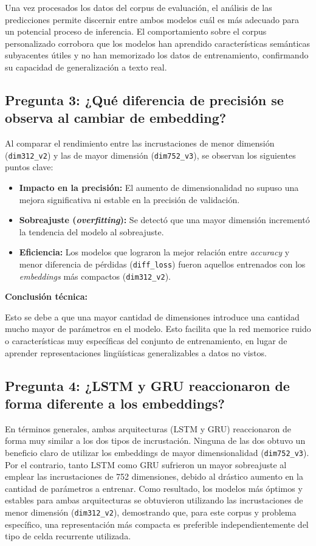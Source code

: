 \documentclass{article}
\begin{document}
Una vez procesados los datos del corpus de evaluación, el análisis de las predicciones
permite discernir entre ambos modelos cuál es más adecuado para un potencial proceso de
inferencia. El comportamiento sobre el corpus personalizado corrobora que los modelos han
aprendido características semánticas subyacentes útiles y no han memorizado los datos de
entrenamiento, confirmando su capacidad de generalización a texto real.

\subsection{Pregunta 3: ¿Qué diferencia de precisión se observa al cambiar de embedding?}

Al comparar el rendimiento entre las incrustaciones de menor dimensión (\texttt{dim312\_v2}) y las de mayor dimensión (\texttt{dim752\_v3}), se observan los siguientes puntos clave:

\begin{itemize}
    \item \textbf{Impacto en la precisión:} El aumento de dimensionalidad no supuso una mejora significativa ni estable en la precisión de validación.
    \item \textbf{Sobreajuste (\textit{overfitting}):} Se detectó que una mayor dimensión incrementó la tendencia del modelo al sobreajuste.
    \item \textbf{Eficiencia:} Los modelos que lograron la mejor relación entre \textit{accuracy} y menor diferencia de pérdidas (\texttt{diff\_loss}) fueron aquellos entrenados con los \textit{embeddings} más compactos (\texttt{dim312\_v2}).
\end{itemize}

\textbf{Conclusión técnica:}

Esto se debe a que una mayor cantidad de dimensiones introduce una cantidad mucho mayor de parámetros en el modelo. Esto facilita que la red memorice ruido o características muy específicas del conjunto de entrenamiento, en lugar de aprender representaciones lingüísticas generalizables a datos no vistos.
\newpage
\subsection{Pregunta 4: ¿LSTM y GRU reaccionaron de forma diferente a los embeddings?}

En términos generales, ambas arquitecturas (LSTM y GRU) reaccionaron de forma muy similar
a los dos tipos de incrustación. Ninguna de las dos obtuvo un beneficio claro de utilizar
los embeddings de mayor dimensionalidad (\texttt{dim752\_v3}). Por el contrario, tanto
LSTM como GRU sufrieron un mayor sobreajuste al emplear las incrustaciones de 752
dimensiones, debido al drástico aumento en la cantidad de parámetros a entrenar. Como
resultado, los modelos más óptimos y estables para ambas arquitecturas se obtuvieron
utilizando las incrustaciones de menor dimensión (\texttt{dim312\_v2}), demostrando que,
para este corpus y problema específico, una representación más compacta es preferible
independientemente del tipo de celda recurrente utilizada.
\end{document}
